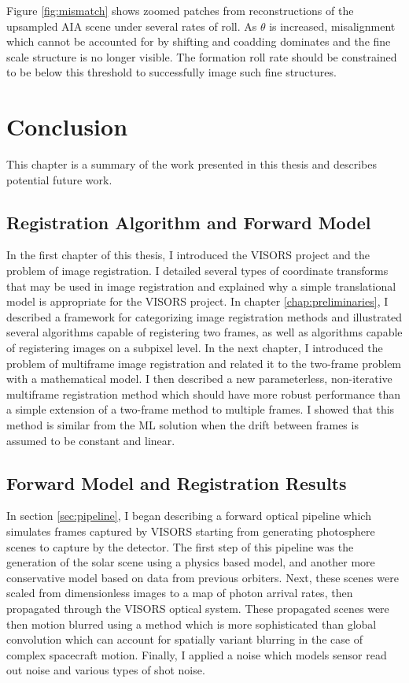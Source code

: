 \documentclass[tocnosub,noragright,centerchapter,12pt]{uiucecethesis09}
\begin{document}
Figure \ref{fig:mismatch} shows zoomed patches from reconstructions of the upsampled AIA scene under several rates of roll.  As $\theta$ is increased, misalignment which cannot be accounted for by shifting and coadding dominates and the fine scale structure is no longer visible.  The formation roll rate should be constrained to be below this threshold to successfully image such fine structures.


\chapter{Conclusion} \label{chap:conclusion}

This chapter is a summary of the work presented in this thesis and describes potential future work.

\section{Registration Algorithm and Forward Model}

In the first chapter of this thesis, I introduced the VISORS project and the problem of image registration.  I detailed several types of coordinate transforms that may be used in image registration and explained why a simple translational model is appropriate for the VISORS project.  In chapter \ref{chap:preliminaries}, I described a framework for categorizing image registration methods and illustrated several algorithms capable of registering two frames, as well as algorithms capable of registering images on a subpixel level.  In the next chapter, I introduced the problem of multiframe image registration and related it to the two-frame problem with a mathematical model.  I then described a new parameterless, non-iterative multiframe registration method which should have more robust performance than a simple extension of a two-frame method to multiple frames.  I showed that this method is similar from the ML solution when the drift between frames is assumed to be constant and linear.

\section{Forward Model and Registration Results}

In section \ref{sec:pipeline}, I began describing a forward optical pipeline which simulates frames captured by VISORS starting from generating photosphere scenes to capture by the detector.  The first step of this pipeline was the generation of the solar scene using a physics based model, and another more conservative model based on data from previous orbiters.  Next, these scenes were scaled from dimensionless images to a map of photon arrival rates, then propagated through the VISORS optical system.  These propagated scenes were then motion blurred using a method which is more sophisticated than global convolution which can account for spatially variant blurring in the case of complex spacecraft motion.  Finally, I applied a noise which models sensor read out noise and various types of shot noise.
\end{document}
